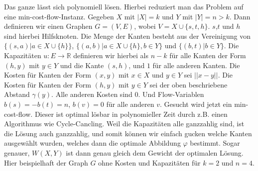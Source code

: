 \documentclass[]{book}
\theoremstyle{definition}
\begin{document}
	Das ganze lässt sich polynomiell lösen. Hierbei reduziert man das Problem auf eine min-cost-flow-Instanz. Gegeben $X$ mit $|X|=k$ und $Y$ mit $|Y|=n>k$. Dann definieren wir einen Graphen $G = (V,E)$, wobei $V=X\cup\{s,t,h\}$. $s$,$t$ und $h$ sind hierbei Hilfsknoten. Die Menge der Kanten besteht aus der Vereinigung von $\{(s,a)|a\in X\cup\{h\}\}$, $\{(a,b)|a\in X\cup\{h\},b\in Y\}$ und $\{(b,t)|b\in Y\}$. Die Kapazitäten $u:E\rightarrow \mathbb{R}$ definieren wir hierbei als $n-k$ für alle Kanten der Form $(h,y)$ mit $y\in Y$ und die Kante $(s,h)$, und $1$ für alle anderen Kanten. Die Kosten für Kanten der Form $(x,y)$ mit $x\in X$ und $y\in Y$ sei $||x-y||$. Die Kosten für Kanten der Form $(h,y)$ mit $y\in Y$ sei der oben beschriebene Abstand $\gamma(y)$. Alle anderen Kosten sind $0$. Und Flow-Variablen $b(s) = -b(t) = n$, $b(v) = 0$ für alle anderen $v$. Gesucht wird jetzt ein min-cost-flow. Dieser ist optimal lösbar in polynomieller Zeit durch z.B. einen Algorithmus wie Cycle-Cancling. Weil die Kapazitäten alle ganzzahlig sind, ist die Lösung auch ganzzahlig, und somit können wir einfach gucken welche Kanten ausgewählt wurden, welches dann die optimale Abbildung $\varphi$ bestimmt. Sogar genauer, $W(X,Y)$ ist dann genau gleich dem Gewicht der optimalen Lösung. Hier beispielhaft der Graph $G$ ohne Kosten und Kapazitäten für $k=2$ und $n=4$.
	
	\begin{figure}[!h]
		\centering
	\end{figure}
	
\end{document}
